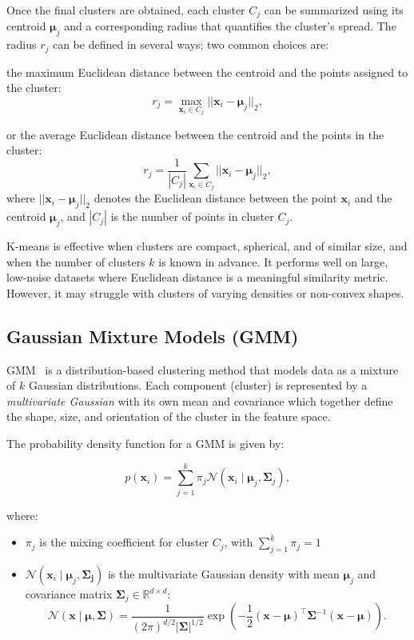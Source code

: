 Once the final clusters are obtained, each cluster $ C_j $ can be summarized
using its centroid $ \boldsymbol{\mu}_j $ and a corresponding radius that
quantifies the cluster's spread. The radius $ r_j $ can be defined in several
ways; two common choices are:

the maximum Euclidean distance between the centroid and the points assigned to
the cluster:
\[
    r_j = \max_{\mathbf{x}_i \in C_j} ||\mathbf{x}_i - \boldsymbol{\mu}_j||_2,
\]

or the average Euclidean distance between the centroid and the points in the
cluster:
\[
    r_j = \frac{1}{|C_j|} \sum_{\mathbf{x}_i \in C_j} ||\mathbf{x}_i - \boldsymbol{\mu}_j||_2,
\]
where $ ||\mathbf{x}_i - \boldsymbol{\mu}_j||_2 $ denotes the Euclidean distance
between the point $ \mathbf{x}_i $ and the centroid $ \boldsymbol{\mu}_j $, and
$ |C_j| $ is the number of points in cluster $ C_j $.

K-means is effective when clusters are compact, spherical, and of similar size,
and when the number of clusters $k$ is known in advance. It performs well on
large, low-noise datasets where Euclidean distance is a meaningful similarity
metric. However, it may struggle with clusters of varying densities or
non-convex shapes.

\subsection*{Gaussian Mixture Models (GMM)}

GMM~\cite{gaussian_mixtures} is a distribution-based clustering method that
models data as a mixture of $k$ Gaussian distributions. Each component
(cluster) is represented by a \emph{multivariate Gaussian} with its own mean
and covariance which together define the shape, size, and orientation of the
cluster in the feature space.

The probability density function for a GMM is given by:

\begin{equation}
    p(\mathbf{x}_i) = \sum_{j=1}^{k} \pi_j \mathcal{N}(\mathbf{x}_i \mid \boldsymbol{\mu}_j, \mathbf{\mathbf{\Sigma}}_j),
\end{equation}

where:
\begin{itemize}
    \item $\pi_j$ is the mixing coefficient for cluster $C_j$, with $\sum_{j=1}^{k} \pi_j = 1$
    \item $\mathcal{N}(\mathbf{x}_i \mid \boldsymbol{\mu}_j, \mathbf{\mathbf{\Sigma}_j})$ is the multivariate Gaussian density with mean $\boldsymbol{\mu}_j$ and covariance matrix $\mathbf{\Sigma}_j \in \mathbb{R}^{d \times d}$:
          \begin{equation}
              \mathcal{N}(\mathbf{x} \mid \boldsymbol{\mu}, \mathbf{\Sigma}) = \frac{1}{(2\pi)^{d/2} |\mathbf{\Sigma}|^{1/2}}
              \exp \left( -\frac{1}{2}(\mathbf{x} - \boldsymbol{\mu})^\top \mathbf{\Sigma}^{-1} (\mathbf{x} - \boldsymbol{\mu}) \right).
          \end{equation}
\end{itemize}

